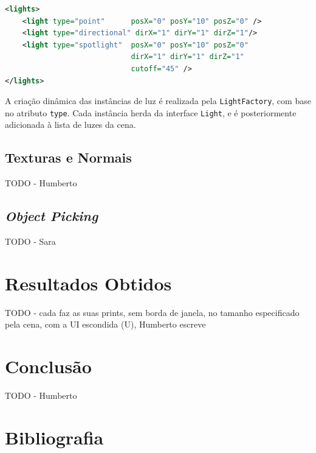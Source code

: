 \documentclass[12pt, a4paper]{article}
\begin{document}
\begin{lstlisting}[language=xml]
<lights>
    <light type="point"      posX="0" posY="10" posZ="0" />
    <light type="directional" dirX="1" dirY="1" dirZ="1"/>
    <light type="spotlight"  posX="0" posY="10" posZ="0"
                             dirX="1" dirY="1" dirZ="1"
                             cutoff="45" />
</lights>
\end{lstlisting}

A criação dinâmica das instâncias de luz é realizada pela \texttt{LightFactory}, com base no
atributo \texttt{type}. Cada instância herda da interface \texttt{Light}, e é posteriormente
adicionada à lista de luzes da cena.

\subsection{Texturas e Normais}

{\color{red} TODO - Humberto}

\subsection{\emph{Object Picking}}

{\color{red} TODO - Sara}

\section{Resultados Obtidos}

{\color{red} TODO - cada faz as suas prints, sem borda de janela, no tamanho especificado pela cena,
com a UI escondida (U), Humberto escreve}

\section{Conclusão}

{\color{red} TODO - Humberto}

\begingroup
\section{Bibliografia}
\renewcommand{\section}[2]{}

\begin{thebibliography}{9}
\end{thebibliography}
\endgroup
\end{document}
